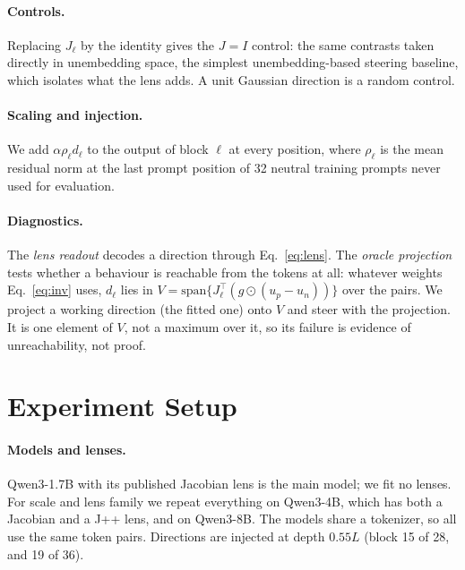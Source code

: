 \documentclass{article}
\begin{document}
\paragraph{Controls.}
Replacing $J_\ell$ by the identity gives the $J{=}I$ control: the same contrasts taken directly in unembedding space, the simplest unembedding-based steering baseline, which isolates what the lens adds. A unit Gaussian direction is a random control.

\paragraph{Scaling and injection.}
We add $\alpha \rho_\ell d_\ell$ to the output of block $\ell$ at every position, where $\rho_\ell$ is the mean residual norm at the last prompt position of 32 neutral training prompts never used for evaluation.

\paragraph{Diagnostics.}
The \emph{lens readout} decodes a direction through Eq.~\ref{eq:lens}. The \emph{oracle projection} tests whether a behaviour is reachable from the tokens at all: whatever weights Eq.~\ref{eq:inv} uses, $d_\ell$ lies in $V = \mathrm{span}\{J_\ell^\top (g \odot (u_p - u_n))\}$ over the pairs. We project a working direction (the fitted one) onto $V$ and steer with the projection. It is one element of $V$, not a maximum over it, so its failure is evidence of unreachability, not proof.

\section{Experiment Setup}
\label{sec:setup}

\paragraph{Models and lenses.} Qwen3-1.7B \citep{yang2025qwen3} with its published Jacobian lens \citep{neuronpedia2026jlens} is the main model; we fit no lenses. For scale and lens family we repeat everything on Qwen3-4B, which has both a Jacobian and a J++ lens, and on Qwen3-8B. The models share a tokenizer, so all use the same token pairs. Directions are injected at depth $0.55L$ (block 15 of 28, and 19 of 36).
\end{document}
